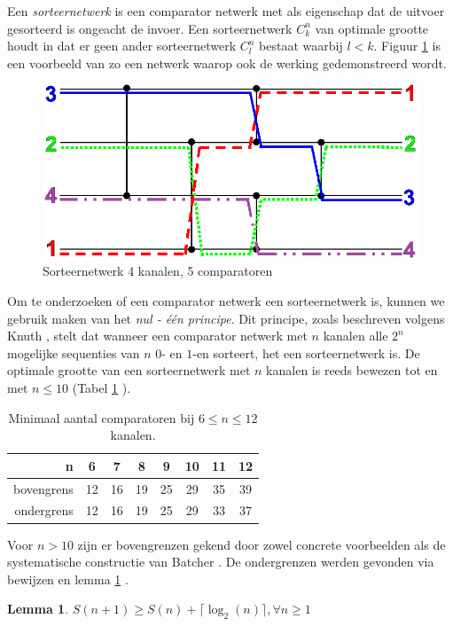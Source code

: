 \documentclass{article}
\newtheorem{lemma}{Lemma}
\begin{document}
Een \textit{sorteernetwerk} is een comparator netwerk met als eigenschap dat de uitvoer gesorteerd is ongeacht de invoer.
Een sorteernetwerk $C^n_k$ van optimale grootte houdt in dat er geen ander sorteernetwerk $C^n_l$ bestaat waarbij $l < k$. %
Figuur \ref{Werking} is een voorbeeld van zo een netwerk waarop ook de werking gedemonstreerd wordt.
\begin{figure}[h!]
\centering
\includegraphics[scale=0.275]{NetworkTransparent.png} 
\caption{Sorteernetwerk 4 kanalen, 5 comparatoren}
\label{Werking}
\end{figure}
Om te onderzoeken of een comparator netwerk een sorteernetwerk is, kunnen we gebruik maken van het \textit{nul - \'e\'en principe}. 
Dit principe, zoals beschreven volgens Knuth \cite{Knuth3}, stelt dat wanneer een comparator netwerk met $n$ kanalen alle $2^n$ mogelijke sequenties van $n$ $0$- en $1$-en sorteert, het een sorteernetwerk is.
De optimale grootte van een sorteernetwerk met $n$ kanalen is reeds bewezen tot en met $n \leq 10$ (Tabel \ref{tabel1} \cite{sortingNetworksSize2014}).
\begin{table}[h!]
\centering
\begin{tabular}{r|c|c|c|c|c|c|c}
n & 6 & 7 & 8 & 9 & 10 & 11 & 12\\ 
\hline 
bovengrens & 12 & 16 & 19 & 25 & 29 & 35 & 39\\ 
\hline 
ondergrens & 12 & 16 & 19 & 25& 29 & 33 & 37\\
\end{tabular} 
\caption{Minimaal aantal comparatoren bij $6 \leq n \leq 12$ kanalen.}
\label{tabel1}
\end{table}
Voor $n > 10$ zijn er bovengrenzen gekend door zowel concrete voorbeelden als de systematische constructie van Batcher \cite{sortingNetworksApplications}. 
De ondergrenzen werden gevonden via bewijzen en lemma \ref{lemma1} \cite{Voorhis1972}.
\begin{lemma}
$S(n+1) \geq S(n) + \lceil \log_2(n) \rceil, \forall n \geq 1$
\label{lemma1}
\end{lemma}
\end{document}
